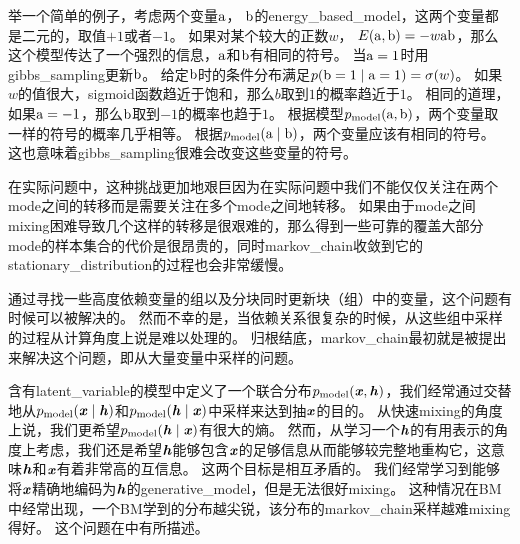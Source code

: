 举一个简单的例子，考虑两个变量$\mathrm{a}$， $\mathrm{b}$的\gls{energy_based_model}，这两个变量都是二元的，取值$+1$或者$-1$。
如果对某个较大的正数$w$， $E(\mathrm{a},\mathrm{b}) = - w \mathrm{a} \mathrm{b}$，那么这个模型传达了一个强烈的信息，$\mathrm{a}$和$\mathrm{b}$有相同的符号。
当$\mathrm{a}=1$时用\gls{gibbs_sampling}更新$\mathrm{b}$。
给定$\mathrm{b}$时的条件分布满足$p(\mathrm{b}=1\mid \mathrm{a}=1) = \sigma(w)$。
如果$w$的值很大，\gls{sigmoid}函数趋近于饱和，那么$b$取到$1$的概率趋近于$1$。
相同的道理，如果$\mathrm{a}=-1$，那么$\mathrm{b}$取到$-1$的概率也趋于$1$。
根据模型$p_{\text{model}}(\mathrm{a},\mathrm{b})$，两个变量取一样的符号的概率几乎相等。
根据$p_{\text{model}}(\mathrm{a}\mid \mathrm{b})$，两个变量应该有相同的符号。
这也意味着\gls{gibbs_sampling}很难会改变这些变量的符号。

在实际问题中，这种挑战更加地艰巨因为在实际问题中我们不能仅仅关注在两个\gls{mode}之间的转移而是需要关注在多个\gls{mode}之间地转移。
如果由于\gls{mode}之间\gls{mixing}困难导致几个这样的转移是很艰难的，那么得到一些可靠的覆盖大部分\gls{mode}的样本集合的代价是很昂贵的，同时\gls{markov_chain}收敛到它的\gls{stationary_distribution}的过程也会非常缓慢。

通过寻找一些高度依赖变量的组以及分块同时更新块（组）中的变量，这个问题有时候可以被解决的。
然而不幸的是，当依赖关系很复杂的时候，从这些组中采样的过程从计算角度上说是难以处理的。
归根结底，\gls{markov_chain}最初就是被提出来解决这个问题，即从大量变量中采样的问题。

含有\gls{latent_variable}的模型中定义了一个联合分布$p_{\text{model}}(\boldsymbol{\mathit{x}},\boldsymbol{\mathit{h}})$，我们经常通过交替地从$p_{\text{model}}(\boldsymbol{\mathit{x}}\mid \boldsymbol{\mathit{h}})$和$p_{\text{model}}(\boldsymbol{\mathit{h}}\mid \boldsymbol{\mathit{x}})$中采样来达到抽$\boldsymbol{\mathit{x}}$的目的。
从快速\gls{mixing}的角度上说，我们更希望$p_{\text{model}}(\boldsymbol{\mathit{h}}\mid \boldsymbol{\mathit{x}})$有很大的熵。
然而，从学习一个$\boldsymbol{\mathit{h}}$的有用表示的角度上考虑，我们还是希望$\boldsymbol{\mathit{h}}$能够包含$\boldsymbol{\mathit{x}}$的足够信息从而能够较完整地重构它，这意味$\boldsymbol{\mathit{h}}$和$\boldsymbol{\mathit{x}}$有着非常高的互信息。
这两个目标是相互矛盾的。
我们经常学习到能够将$\boldsymbol{\mathit{x}}$精确地编码为$\boldsymbol{\mathit{h}}$的\gls{generative_model}，但是无法很好\gls{mixing}。
这种情况在\gls{BM}中经常出现，一个\gls{BM}学到的分布越尖锐，该分布的\gls{markov_chain}采样越难\gls{mixing}得好。
这个问题在中有所描述。


